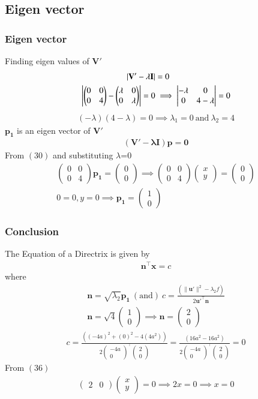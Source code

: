 \documentclass{beamer}
\providecommand{\brak}[1]{\ensuremath{\left(#1\right)}}
\theoremstyle{remark}
\providecommand{\norm}[1]{\lVert#1\rVert}
\newcommand{\myvec}[1]{\ensuremath{\begin{pmatrix}#1\end{pmatrix}}}
\let\vec\mathbf
\numberwithin{equation}{section}
\begin{document}
\begin{frame}
\subsection{Eigen vector}
\frametitle{Eigen vector}
Finding eigen values of $\vec{V'}$
 \begin{align}
         |\vec{V'}-\lambda\vec{I}|&=0\\
         \mydet{\myvec{0&0\\0&4}-\myvec{\lambda&0\\0&\lambda}}=0&\implies \mydet{-\lambda&0\\0& 4-\lambda}=0
     \end{align}
     \begin{align}
         \brak{-\lambda}\brak{4-\lambda}=0 \implies \lambda_1=0\ \text{and}\ \lambda_2=4
     \end{align}
$\vec{p_1}$ is an eigen vector of $\vec{V'}$
\begin{align}
   \brak{ \vec{\vec{V'}-\lambda\vec{I}}}\vec{p}=\vec{0}
\end{align}
From \brak{30} and substituting $\lambda$=0
\begin{align}
    \myvec{0&0\\0&4}\vec{p_1}=\myvec{0\\0}\implies
    \myvec{0&0\\0&4}\myvec{x\\y}=\myvec{0\\0} \\
    0=0,y=0 \implies \vec{p_1}=\myvec{1\\0}
\end{align}
\end{frame}
\begin{frame}
\frametitle{Conclusion}

 The Equation of a Directrix is given by
 \begin{align}
     \vec{n}^\top\vec{x}=c
 \end{align}
 where
 \begin{align}
     \vec{n}=\sqrt{\lambda_2}\vec{p_1}\ \brak{\text{and}}\ c=\frac{\brak{\norm{\vec{u'}}^2-\lambda_2f}}{2\vec{u'}^\top\vec{n}} \\
     \vec{n}=\sqrt{4}\myvec{1\\0} \implies \vec{n}=\myvec{2\\0} 
     \end{align}
     \begin{align}
     c=\frac{\brak{\brak{-4a}^2+\brak{0}^2-4\brak{4a^2}}}{2\myvec{-4a\\0}^\top\myvec{2\\0}}  =\frac{\brak{16a^2-16a^2}}{2\myvec{-4a\\0}^\top\myvec{2\\0}}  =0
 \end{align}
 From \brak{36}
 \begin{align}
     \myvec{2&0}\myvec{x\\y}=0 \implies 2x=0 \implies x=0
 \end{align}
\end{frame}
\end{document}
